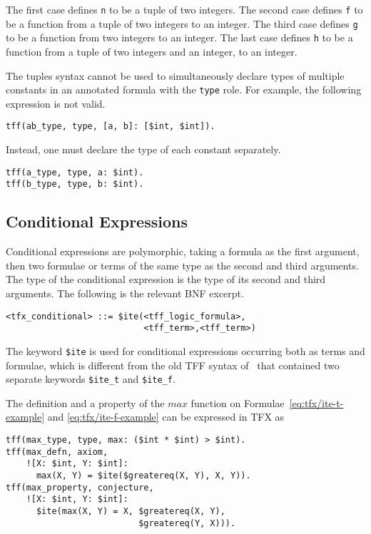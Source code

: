 The first case defines \lstinline|n| to be a tuple of two integers.
The second case defines \lstinline|f| to be a function from a tuple of two integers
to an integer.
The third case defines \lstinline|g| to be a function from two integers to an integer.
The last case defines \lstinline|h| to be a function from a tuple of two integers and
an integer, to an integer.

The tuples syntax cannot be used to simultaneously declare types of multiple constants in an annotated formula with the \lstinline'type' role. For example, the following expression is not valid.
\begin{lstlisting}[language=tptp]
tff(ab_type, type, [a, b]: [$int, $int]).
\end{lstlisting}
Instead, one must declare the type of each constant separately.
\begin{lstlisting}[language=tptp]
tff(a_type, type, a: $int).
tff(b_type, type, b: $int).
\end{lstlisting}

\subsection{Conditional Expressions}

Conditional expressions are polymorphic, taking a formula as the first 
argument, then two formulae or terms of the same type as the second and 
third arguments. 
The type of the conditional expression is the type of its second and third 
arguments. 
The following is the relevant BNF excerpt.
\begin{lstlisting}[language=bnf]
<tfx_conditional> ::= $ite(<tff_logic_formula>,
                           <tff_term>,<tff_term>)
\end{lstlisting}

The keyword \lstinline'$ite' is used for conditional expressions occurring both as
terms and formulae, which is different from the old TFF syntax of \ITE\ that
contained two separate keywords \lstinline'$ite_t' and \lstinline'$ite_f'.

The definition and a property of the $\mathit{max}$ function on Formulae~\ref{eq:tfx/ite-t-example} and \ref{eq:tfx/ite-f-example} can be expressed in
TFX as
\begin{lstlisting}[language=tptp]
tff(max_type, type, max: ($int * $int) > $int).
tff(max_defn, axiom,
    ![X: $int, Y: $int]:
      max(X, Y) = $ite($greatereq(X, Y), X, Y)).
tff(max_property, conjecture,
    ![X: $int, Y: $int]: 
      $ite(max(X, Y) = X, $greatereq(X, Y),
                          $greatereq(Y, X))).
\end{lstlisting}

